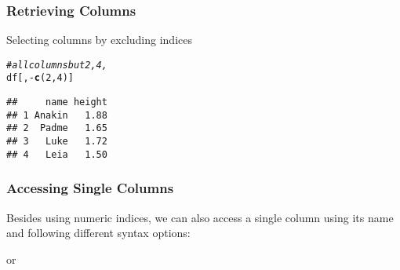 \documentclass[12pt]{beamer}\usepackage[]{graphicx}\usepackage[]{color}
\makeatletter
\newcommand{\hlnum}[1]{\textcolor[rgb]{0.686,0.059,0.569}{#1}}%
\newcommand{\hlcom}[1]{\textcolor[rgb]{0.678,0.584,0.686}{\textit{#1}}}%
\newcommand{\hlopt}[1]{\textcolor[rgb]{0,0,0}{#1}}%
\newcommand{\hlstd}[1]{\textcolor[rgb]{0.345,0.345,0.345}{#1}}%
\newcommand{\hlkwd}[1]{\textcolor[rgb]{0.737,0.353,0.396}{\textbf{#1}}}%
\newenvironment{kframe}{%
 \def\at@end@of@kframe{}%
 \ifinner\ifhmode%
  \def\at@end@of@kframe{\end{minipage}}%
  \begin{minipage}{\columnwidth}%
 \fi\fi%
 \def\FrameCommand##1{\hskip\@totalleftmargin \hskip-\fboxsep
 \colorbox{shadecolor}{##1}\hskip-\fboxsep
     \hskip-\linewidth \hskip-\@totalleftmargin \hskip\columnwidth}%
 \MakeFramed {\advance\hsize-\width
   \@totalleftmargin\z@ \linewidth\hsize
   \@setminipage}}%
 {\par\unskip\endMakeFramed%
 \at@end@of@kframe}
\newenvironment{knitrout}{}{} %
\makeatother
\begin{document}

\begin{frame}[fragile]
\frametitle{Retrieving Columns}

Selecting columns by excluding indices
\begin{knitrout}\footnotesize
{}\color{fgcolor}\begin{kframe}
\begin{alltt}
\hlcom{# all columns but 2, 4,}
\hlstd{df[ ,} \hlopt{-}\hlkwd{c}\hlstd{(}\hlnum{2}\hlstd{,}\hlnum{4}\hlstd{)]}
\end{alltt}
\begin{verbatim}
##     name height
## 1 Anakin   1.88
## 2  Padme   1.65
## 3   Luke   1.72
## 4   Leia   1.50
\end{verbatim}
\end{kframe}
\end{knitrout}

\end{frame}


\begin{frame}
\frametitle{Accessing Single Columns}

Besides using numeric indices, we can also access a single column using its name and following different syntax options:

\bi
  \item {}
  \item {}
  \item {} or 
  \item {}
\ei

\end{frame}

\end{document}
